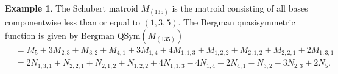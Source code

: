 \documentclass[12pt,reqno]{amsart}
\numberwithin{definition}{section}
\theoremstyle{definition}
\newtheorem{example}[definition]{Example}
\newcommand{\comment}[1]{\textsf{\footnotesize #1}}
\begin{document}
\begin{example}




The Schubert matroid $M_{(135)}$ is the matroid consisting of 
all bases componentwise less than or equal to $(1,3,5)$.  The Bergman quasisymmetric function is given by $ \textrm{Bergman QSym}(M_{(135)})$ 
\begin{align*}
&  =  M_5 + 3M_{2,3} + M_{3,2} + M_{4,1} + 3M_{1,4}  + 4M_{1,1,3} + M_{1,2,2} + M_{2,1,2} + M_{2,2,1} + 2M_{1,3,1}\\
&  =  2N_{1,3,1} + N_{2,2,1} + N_{2,1,2} + N_{1,2,2} + 4N_{1,1,3}  - 4 N_{1,4} - 2N_{4,1} - N_{3,2} - 3N_{2,3} + 2N_5.
\end{align*}

\end{example}







\end{document}
